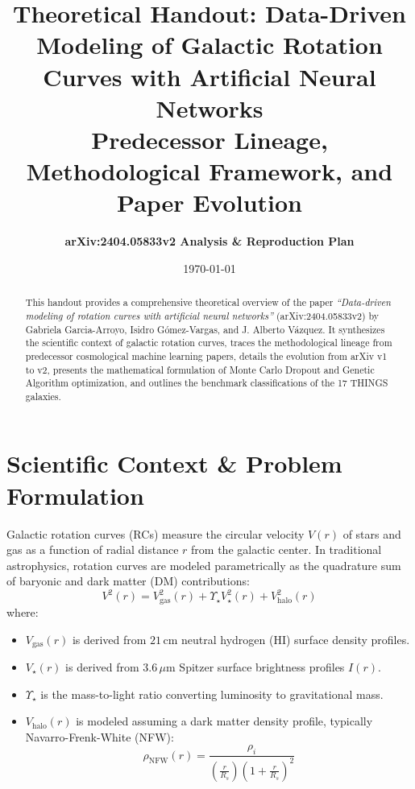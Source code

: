 \documentclass[11pt,a4paper]{article}
\title{\textbf{Theoretical Handout: Data-Driven Modeling of Galactic Rotation Curves with Artificial Neural Networks}\\
\large Predecessor Lineage, Methodological Framework, and Paper Evolution}
\author{\textbf{arXiv:2404.05833v2 Analysis \& Reproduction Plan}}
\date{\today}
\begin{document}
\maketitle

\begin{abstract}
This handout provides a comprehensive theoretical overview of the paper \textit{``Data-driven modeling of rotation curves with artificial neural networks''} (arXiv:2404.05833v2) by Gabriela Garcia-Arroyo, Isidro G\'omez-Vargas, and J. Alberto V\'azquez. It synthesizes the scientific context of galactic rotation curves, traces the methodological lineage from predecessor cosmological machine learning papers, details the evolution from arXiv v1 to v2, presents the mathematical formulation of Monte Carlo Dropout and Genetic Algorithm optimization, and outlines the benchmark classifications of the 17 THINGS galaxies.
\end{abstract}

\section{Scientific Context \& Problem Formulation}

Galactic rotation curves (RCs) measure the circular velocity $V(r)$ of stars and gas as a function of radial distance $r$ from the galactic center. In traditional astrophysics, rotation curves are modeled parametrically as the quadrature sum of baryonic and dark matter (DM) contributions:
\begin{equation}
V^2(r) = V_{\text{gas}}^2(r) + \Upsilon_\star V_\star^2(r) + V_{\text{halo}}^2(r)
\end{equation}
where:
\begin{itemize}
    \item $V_{\text{gas}}(r)$ is derived from $21\,\text{cm}$ neutral hydrogen (HI) surface density profiles.
    \item $V_\star(r)$ is derived from $3.6\,\mu\text{m}$ Spitzer surface brightness profiles $I(r)$.
    \item $\Upsilon_\star$ is the mass-to-light ratio converting luminosity to gravitational mass.
    \item $V_{\text{halo}}(r)$ is modeled assuming a dark matter density profile, typically Navarro-Frenk-White (NFW):
    \begin{equation}
    \rho_{\text{NFW}}(r) = \frac{\rho_i}{\left(\frac{r}{R_s}\right) \left(1 + \frac{r}{R_s}\right)^2}
    \end{equation}
\end{itemize}
\end{document}
